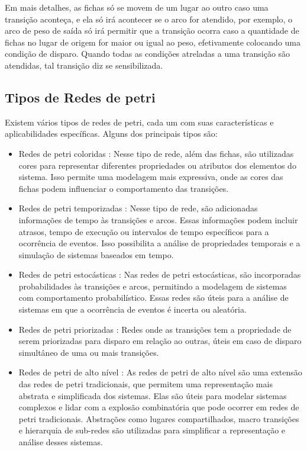 Em mais detalhes, as fichas só se movem de um lugar ao outro caso uma transição aconteça, e ela só irá acontecer se o arco for atendido, por exemplo, o arco de peso de saída só irá permitir que a transição ocorra caso a quantidade de fichas no lugar de origem for maior ou igual ao peso, efetivamente colocando uma condição de disparo. Quando todas as condições atreladas a uma transição são atendidas, tal transição diz se sensibilizada. 

\subsection{Tipos de Redes de petri}

Existem vários tipos de redes de petri, cada um com suas características e aplicabilidades específicas. Alguns dos principais tipos são:

\begin{itemize}
	\item Redes de petri coloridas \cite{coloredpetrinets}: Nesse tipo de rede, além das fichas, são utilizadas cores para representar diferentes propriedades ou atributos dos elementos do sistema. Isso permite uma modelagem mais expressiva, onde as cores das fichas podem influenciar o comportamento das transições.
	
	\item Redes de petri temporizadas \cite{petrinetmodeling}: Nesse tipo de rede, são adicionadas informações de tempo às transições e arcos. Essas informações podem incluir atrasos, tempo de execução ou intervalos de tempo específicos para a ocorrência de eventos. Isso possibilita a análise de propriedades temporais e a simulação de sistemas baseados em tempo.
	
	\item Redes de petri estocásticas \cite{stochasticpetrinets}: Nas redes de petri estocásticas, são incorporadas probabilidades às transições e arcos, permitindo a modelagem de sistemas com comportamento probabilístico. Essas redes são úteis para a análise de sistemas em que a ocorrência de eventos é incerta ou aleatória.
	
	\item Redes de petri priorizadas \cite{petrinetmodeling}: Redes onde as transições tem a propriedade de serem priorizadas para disparo em relação ao outras, úteis em caso de disparo simultâneo de uma ou mais transições.

	\item Redes de petri de alto nível \cite{highlevelpetrinets}: As redes de petri de alto nível são uma extensão das redes de petri tradicionais, que permitem uma representação mais abstrata e simplificada dos sistemas. Elas são úteis para modelar sistemas complexos e lidar com a explosão combinatória que pode ocorrer em redes de petri tradicionais. Abstrações como lugares compartilhados, macro transições e hierarquia de sub-redes são utilizadas para simplificar a representação e análise desses sistemas.
\end{itemize}

